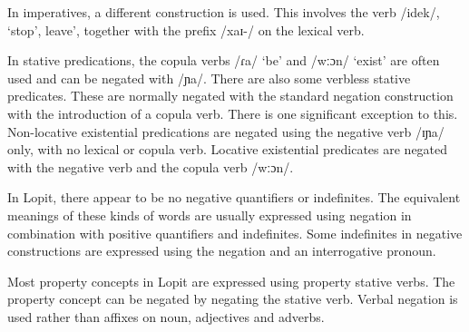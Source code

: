\documentclass[output=paper,colorlinks,citecolor=brown,draftmode]{langscibook}
\begin{document}
In imperatives, a different construction is used. This involves the verb /idek/, ‘stop’, leave’, together with the prefix /xaɪ-/ on the lexical verb. 

In stative predications, the copula verbs /ɾa/ ‘be’ and /wːɔn/ ‘exist’ are often used and can be negated with /ɲa/. There are also some verbless stative predicates.  These are normally negated with the standard negation construction with the introduction of a copula verb. There is one significant exception to this. Non-locative existential predications are negated using the negative verb /ɪɲa/ only, with no lexical or copula verb. Locative existential predicates are negated with the negative verb and the copula verb /wːɔn/.  

In Lopit, there appear to be no negative quantifiers or indefinites. The equivalent meanings of these kinds of words are usually expressed using negation in combination with positive quantifiers and indefinites. Some indefinites in negative constructions are expressed using the negation and an interrogative pronoun.

Most property concepts in Lopit are expressed using property stative verbs.  The property concept can be negated by negating the stative verb. Verbal negation is used rather than affixes on noun, adjectives and adverbs.
\end{document}
